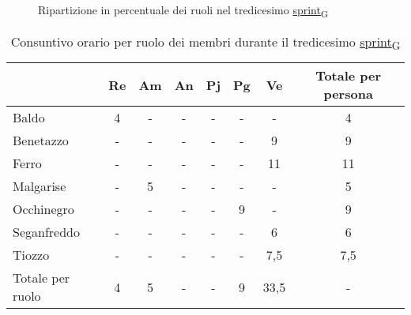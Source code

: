 \begin{figure}[!h]
    \centering
    \caption{Ripartizione in percentuale dei ruoli nel tredicesimo \href{https://7last.github.io/docs/rtb/documentazione-interna/glossario\#sprint}{sprint\textsubscript{G}}}
\end{figure}


\begin{table}[!h]
    \centering
    \begin{tabular}{ | l | c | c | c | c | c | c | c | }
        \hline
        \textbf{} & \textbf{Re} & \textbf{Am} &\textbf{An} & \textbf{Pj} & \textbf{Pg} & \textbf{Ve} & \textbf{Totale per persona} \\
        \hline
        Baldo            &  4   &  -   &  -   &  -   &  -   &  -   &  4   \\
        Benetazzo        &  -   &  -   &  -   &  -   &  -   &  9   &  9   \\
        Ferro            &  -   &  -   &  -   &  -   &  -   & 11   & 11   \\
        Malgarise        &  -   &  5   &  -   &  -   &  -   &  -   &  5   \\
        Occhinegro       &  -   &  -   &  -   &  -   &  9   &  -   &  9   \\
        Seganfreddo      &  -   &  -   &  -   &  -   &  -   &  6   &  6   \\
        Tiozzo           &  -   &  -   &  -   &  -   &  -   &  7,5 &  7,5 \\
        \hline
        Totale per ruolo &  4   &  5   &  -   &  -   &  9   & 33,5 &  -   \\
        \hline
    \end{tabular}
    \caption{Consuntivo orario per ruolo dei membri durante il tredicesimo \href{https://7last.github.io/docs/rtb/documentazione-interna/glossario\#sprint}{sprint\textsubscript{G}}}
\end{table}

